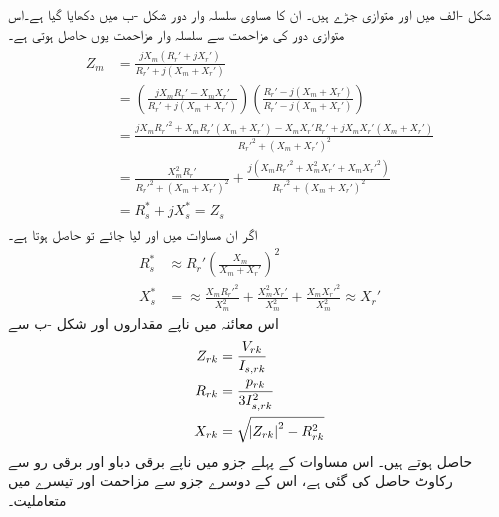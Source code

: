 شکل  -الف میں   اور  متوازی جڑے ہیں۔ ان کا مساوی سلسلہ وار دور شکل -ب میں دکھایا گیا ہے۔اس متوازی دور کی مزاحمت  سے سلسلہ وار مزاحمت   یوں حاصل ہوتی ہے۔
\begin{gather}
\begin{aligned}
Z_m&=\frac{j X_m (R_r'+j X_r')}{R_r'+j(X_m+X_r')}\\
&=\left( \frac{j X_m R_r' -X_m X_r'}{R_r'+j(X_m+X_r')} \right) \left( \frac{R_r'-j(X_m+X_r')}{R_r'-j(X_m+X_r')}\right)\\
&=\frac{jX_m R_r'^2+X_m R_r'(X_m+X_r')-X_m X_r' R_r' +j X_m X_r'(X_m+X_r')}{R_r'^2+(X_m+X_r')^2}\\
&=\frac{X_m^2 R_r'}{R_r'^2+(X_m+X_r')^2}+\frac{j(X_m R_r'^2+X_m^2 X_r'+X_m X_r'^2)}{R_r'^2+(X_m+X_r')^2}\\
&=R_s^*+j X_s^* =Z_s
\end{aligned}
\end{gather}
اگر ان مساوات میں  اور   لیا جائے تو حاصل ہوتا ہے۔
\begin{align}\label{مساوات_امالی_تقریبا_مزاحمت}
R_s^*& \approx R_r' \left(\frac{X_m}{X_m+X_r'} \right)^2 \\
X_s^*&= \approx  \frac{X_m R_r'^2}{X_m^2}+\frac{X_m^2 X_r'}{X_m^2}+\frac{X_m X_r'^2}{X_m^2} \approx X_r'
\end{align}
اس معائنہ میں ناپے مقداروں اور شکل -ب سے
\begin{gather}
\begin{aligned}
Z_{rk} &=\frac{V_{rk}}{I_{s,rk}}\\
R_{rk}&=\frac{p_{rk}}{3 I_{s,rk}^2}\\
X_{rk}&=\sqrt{\abs{Z_{rk}}^2-R_{rk}^2}
\end{aligned}
\end{gather}
حاصل ہوتے ہیں۔ اس مساوات کے پہلے جزو میں ناپے برقی دباو اور برقی رو سے رکاوٹ حاصل کی گئی ہے، اس کے دوسرے جزو سے مزاحمت اور تیسرے میں متعاملیت۔

